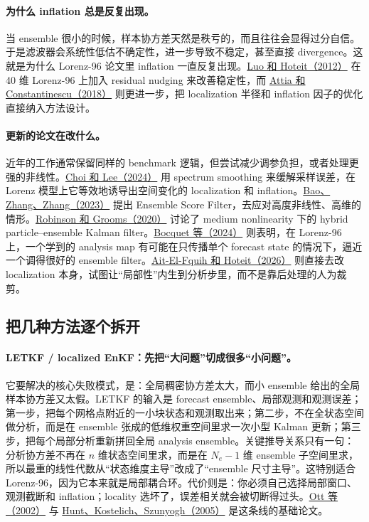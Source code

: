\documentclass[12pt,a4paper]{ctexart}
\begin{document}
\paragraph{为什么 inflation 总是反复出现。}
当 ensemble 很小的时候，样本协方差天然是秩亏的，而且往往会显得过分自信。于是滤波器会系统性低估不确定性，进一步导致不稳定，甚至直接 divergence。这就是为什么 Lorenz-96 论文里 inflation 一直反复出现。\href{https://arxiv.org/abs/1210.1318}{Luo 和 Hoteit（2012）} 在 40 维 Lorenz-96 上加入 residual nudging 来改善稳定性，而 \href{https://arxiv.org/abs/1806.10655}{Attia 和 Constantinescu（2018）} 则更进一步，把 localization 半径和 inflation 因子的优化直接纳入方法设计。

\paragraph{更新的论文在改什么。}
近年的工作通常保留同样的 benchmark 逻辑，但尝试减少调参负担，或者处理更强的非线性。\href{https://arxiv.org/abs/2404.00154}{Choi 和 Lee（2024）} 用 spectrum smoothing 来缓解采样误差，在 Lorenz 模型上它等效地诱导出空间变化的 localization 和 inflation。\href{https://arxiv.org/abs/2309.00983}{Bao、Zhang、Zhang（2023）} 提出 Ensemble Score Filter，去应对高度非线性、高维的情形。\href{https://arxiv.org/abs/2006.04699}{Robinson 和 Grooms（2020）} 讨论了 medium nonlinearity 下的 hybrid particle--ensemble Kalman filter。\href{https://arxiv.org/abs/2408.04739}{Bocquet 等（2024）} 则表明，在 Lorenz-96 上，一个学到的 analysis map 有可能在只传播单个 forecast state 的情况下，逼近一个调得很好的 ensemble filter。\href{https://arxiv.org/abs/2603.03926}{Ait-El-Fquih 和 Hoteit（2026）} 则直接去改 localization 本身，试图让“局部性”内生到分析步里，而不是靠后处理的人为裁剪。

\subsection{把几种方法逐个拆开}

\paragraph{LETKF / localized EnKF：先把“大问题”切成很多“小问题”。}
它要解决的核心失败模式，是：全局稠密协方差太大，而小 ensemble 给出的全局样本协方差又太假。LETKF 的输入是 forecast ensemble、局部观测和观测误差；第一步，把每个网格点附近的一小块状态和观测取出来；第二步，不在全状态空间做分析，而是在 ensemble 张成的低维权重空间里求一次小型 Kalman 更新；第三步，把每个局部分析重新拼回全局 analysis ensemble。关键推导关系只有一句：分析协方差不再在 \(n\) 维状态空间里求，而是在 \(N_e-1\) 维 ensemble 子空间里求，所以最重的线性代数从“状态维度主导”改成了“ensemble 尺寸主导”。这特别适合 Lorenz-96，因为它本来就是局部耦合环。代价则是：你必须自己选择局部窗口、观测截断和 inflation；locality 选坏了，误差相关就会被切断得过头。\href{https://arxiv.org/abs/physics/0203058}{Ott 等（2002）} 与 \href{https://arxiv.org/abs/physics/0511236}{Hunt、Kostelich、Szunyogh（2005）} 是这条线的基础论文。
\end{document}

